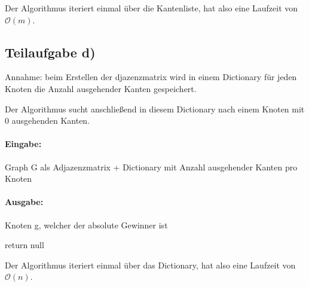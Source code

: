\documentclass[12pt]{scrartcl}%
\theoremstyle{nonumberplain}
\newcommand{\bO}[1]{\mathcal O(#1)}
\begin{document}
Der Algorithmus iteriert einmal über die Kantenliste, hat also eine Laufzeit von $\bO{m}$.

\subsection*{Teilaufgabe d)}

Annahme: beim Erstellen der djazenzmatrix wird in einem Dictionary für jeden Knoten die Anzahl ausgehender Kanten gespeichert. 

Der Algorithmus sucht anschließend in diesem Dictionary nach einem Knoten mit 0 ausgehenden Kanten.

\paragraph{Eingabe:} Graph G als Adjazenzmatrix + Dictionary mit Anzahl ausgehender Kanten pro Knoten

\paragraph{Ausgabe:} Knoten g, welcher der absolute Gewinner ist

\begin{algorithm}
	 {
	}
	return null\;
\end{algorithm}

Der Algorithmus iteriert einmal über das Dictionary, hat also eine Laufzeit von $\bO{n}$.
\end{document}
